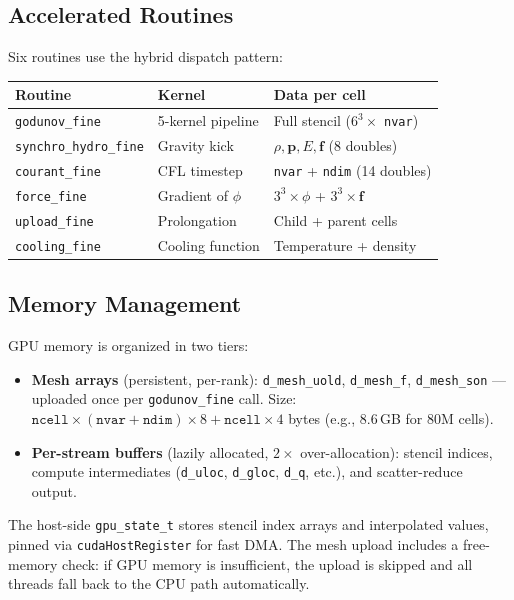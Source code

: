 \documentclass[11pt,fleqn]{book}
\begin{document}
\subsection{Accelerated Routines}

Six routines use the hybrid dispatch pattern:

\begin{center}
\begin{tabular}{lll}
\toprule
\textbf{Routine} & \textbf{Kernel} & \textbf{Data per cell} \\
\midrule
\texttt{godunov\_fine}           & 5-kernel pipeline  & Full stencil ($6^3 \times$ \texttt{nvar}) \\
\texttt{synchro\_hydro\_fine}    & Gravity kick       & $\rho, \mathbf{p}, E, \mathbf{f}$ (8 doubles) \\
\texttt{courant\_fine}           & CFL timestep       & \texttt{nvar} + \texttt{ndim} (14 doubles) \\
\texttt{force\_fine}             & Gradient of $\phi$ & $3^3 \times \phi$ + $3^3 \times \mathbf{f}$ \\
\texttt{upload\_fine}            & Prolongation       & Child + parent cells \\
\texttt{cooling\_fine}           & Cooling function   & Temperature + density \\
\bottomrule
\end{tabular}
\end{center}

\subsection{Memory Management}

GPU memory is organized in two tiers:
\begin{itemize}[nosep]
\item \textbf{Mesh arrays} (persistent, per-rank): \texttt{d\_mesh\_uold}, \texttt{d\_mesh\_f}, \texttt{d\_mesh\_son} --- uploaded once per \texttt{godunov\_fine} call.  Size: $\texttt{ncell} \times (\texttt{nvar} + \texttt{ndim}) \times 8 + \texttt{ncell} \times 4$ bytes (e.g., 8.6\,GB for 80M cells).
\item \textbf{Per-stream buffers} (lazily allocated, $2\times$ over-allocation): stencil indices, compute intermediates (\texttt{d\_uloc}, \texttt{d\_gloc}, \texttt{d\_q}, etc.), and scatter-reduce output.
\end{itemize}

The host-side \texttt{gpu\_state\_t} stores stencil index arrays and interpolated values, pinned via \texttt{cudaHostRegister} for fast DMA.  The mesh upload includes a free-memory check: if GPU memory is insufficient, the upload is skipped and all threads fall back to the CPU path automatically.
\end{document}
